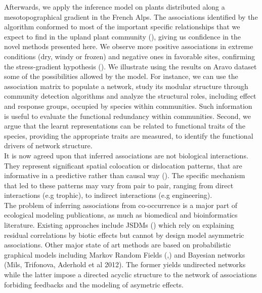 \documentclass[10pt,a4paper]{article}
\begin{document}
Afterwards, we apply the inference model on plants distributed along a mesotopographical gradient in the French Alps. The associations identified by the algorithm conformed to most of the important specific relationships that we expect to find in the upland plant community (\cite{choler2001facilitation}), giving us confidence in the novel methods presented here. We observe more positive associations in extreme conditions (dry, windy or frozen) and negative ones in favorable sites, confirming the stress-gradient hypothesis (\cite{callaway2002positive}). We illustrate using the results on Aravo dataset some of the possibilities allowed by the model. For instance, we can use the association matrix to populate a network, study its modular structure through community detection algorithms and analyze the structural roles, including effect and response groups, occupied by species within communities. Such information is useful to evaluate the functional redundancy within communities. Second, we argue that the learnt representations can be related to functional traits of the species, providing the appropriate traits are measured, to identify the functional drivers of network structure. \\

It is now agreed upon that inferred associations are not biological interactions. They represent significant spatial colocation or dislocation patterns, that are informative in a predictive rather than causal way (\cite{milns2010revealing}). The specific mechanism that led to these patterns may vary from pair to pair, ranging from direct interactions (e.g trophic), to indirect interactions (e.g engineering). \\

The problem of inferring associations from co-occurrence is a major part of ecological modeling publications, as much as biomedical and bioinformatics literature. Existing approaches include JSDMs (\cite{ovaskainen2017make}) which rely on explaining residual correlations by biotic effects but cannot by design model asymmetric associations. Other major state of art methods are based on probabilistic graphical models including Markov Random Fields (\cite{harris2016inferring},\cite{chiquet2018variational}) and Bayesian networks (Mils, Trifonova, Aderhold et al 2012). The former yields undirected networks while the latter impose a directed acyclic structure to the network of associations forbiding feedbacks and the modeling of asymetric effects. \\
\end{document}
